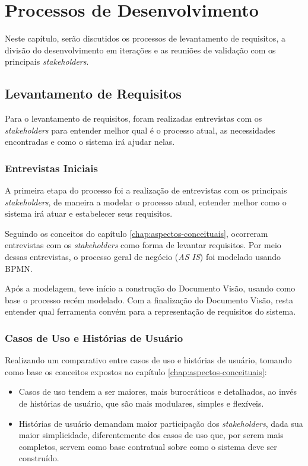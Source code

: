 \chapter{Processos de Desenvolvimento}\label{chap:processos-desenvolvimento}
Neste capítulo, serão discutidos os processos de levantamento de requisitos, a divisão do desenvolvimento em iterações e as reuniões de validação com os principais \textit{stakeholders}.

\section{Levantamento de Requisitos}
Para o levantamento de requisitos, foram realizadas entrevistas com os \textit{stakeholders} para entender melhor qual é o processo atual, as necessidades encontradas e como o sistema irá ajudar nelas.

\subsection{Entrevistas Iniciais}
A primeira etapa do processo foi a realização de entrevistas com os principais \textit{stakeholders}, de maneira a modelar o processo atual, entender melhor como o sistema irá atuar e estabelecer seus requisitos.

Seguindo os conceitos do capítulo \ref{chap:aspectos-conceituais}, ocorreram entrevistas com os \textit{stakeholders} como forma de levantar requisitos. Por meio dessas entrevistas, o processo geral de negócio (\textit{AS IS}) foi modelado usando BPMN.

Após a modelagem, teve início a construção do Documento Visão, usando como base o processo recém modelado. Com a finalização do Documento Visão, resta entender qual ferramenta convém para a representação de requisitos do sistema.

\subsection{Casos de Uso e Histórias de Usuário}
Realizando um comparativo entre casos de uso e histórias de usuário, tomando como base os conceitos expostos no capítulo \ref{chap:aspectos-conceituais}:

\begin{itemize}
    \item Casos de uso tendem a ser maiores, mais burocráticos e detalhados, ao invés de histórias de usuário, que são mais modulares, simples e flexíveis.
    \item Histórias de usuário demandam maior participação dos \textit{stakeholders}, dada sua maior simplicidade, diferentemente dos casos de uso que, por serem mais completos, servem como base contratual sobre como o sistema deve ser construído.
\end{itemize}

